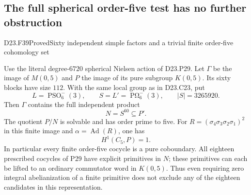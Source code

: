 \subsection{The full spherical order-five test has no further obstruction}

\begin{statement}{D23.F39}{Proved}{Sixty independent simple factors and a trivial finite order-five cohomology set}
\end{statement}
Use the literal degree-$6720$ spherical Nielsen action of D23.P29.
Let $\Gamma$ be the image of $M(0,5)$ and $P$ the image of its
pure subgroup $K(0,5)$. Its sixty blocks have size $112$.
With the same local group as in D23.C23, put
\[
 L=\operatorname{PSO}_6^-(3),\qquad
 S=L'=\operatorname{P\Omega}_6^-(3),\qquad |S|=3265920.
\]
Then $\Gamma$ contains the full independent product
\[
                    N=S^{60}\subseteq P'.
\]
The quotient $P/N$ is solvable and has order prime to five.
For $R=(\sigma_4\sigma_3\sigma_2\sigma_1)^2$ in this finite
image and $\alpha=\operatorname{Ad}(R)$, one has
\[
                         H^1(C_5,P)=1.
\]
In particular every finite order-five cocycle is a pure
coboundary. All eighteen prescribed cocycles of P29 have
explicit primitives in $N$; these primitives can each be lifted
to an ordinary commutator word in $K(0,5)$. Thus even requiring
zero integral abelianization of a finite primitive does not
exclude any of the eighteen candidates in this representation.

